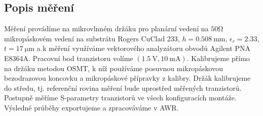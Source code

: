 \documentclass[11pt,a4paper]{article}
\newcommand{\Ohm}{\mathrm{\Omega}}
\newcommand{\mm}{\mathrm{mm}}
\newcommand{\mum}{\mathrm{\mu m}}
\begin{document}
\subsection*{Popis měření}
Měření provádíme na mikrovlnném držáku pro planární vedení na $50\Ohm$ mikropáskovém vedení na substrátu Rogers CuClad 233, $h = 0.508\ \mm$, $\epsilon_r = 2.33$, $t = 17\ \mum$ a k měření využíváme vektorového analyzátoru obvodů Agilent PNA E8364A. Pracovní bod tranzistoru volíme $(1.5\ \mathrm{V},10\ \mathrm{mA})$. Kalibrujeme přímo na držáku metodou OSMT, k níž používáme posuvnou mikropáskovou bezodrazovou koncovku a mikropáskové přípravky z kalibry. Držák kalibrujeme do středu, tj. referenční rovina měření bude uprostřed měřených tranzistorů. Postupně měříme S-parametry tranzistorů ve všech konfiguracích montáže. Výsledné průběhy exportujeme a zpracováváme v AWR.
\end{document}
